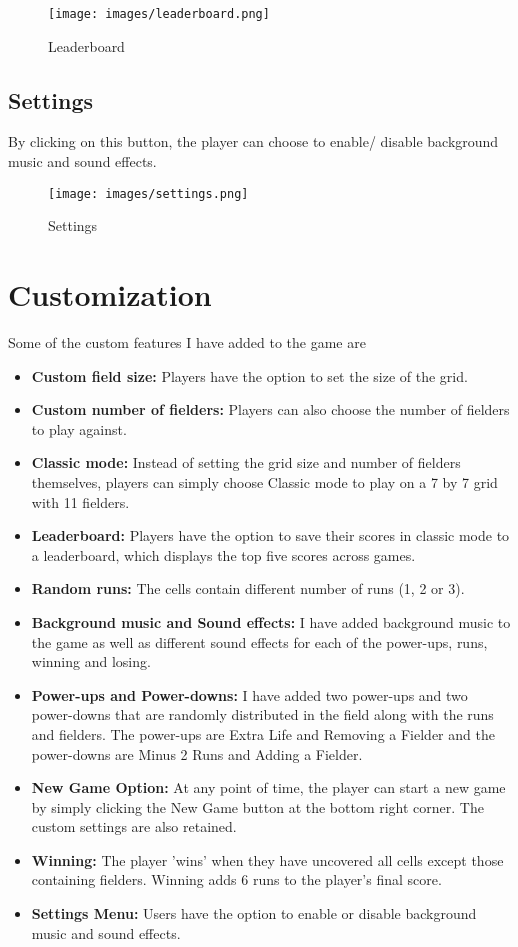 \documentclass{article}
\begin{document}
\begin{figure}[h!]
    \centering
    \texttt{[image: images/leaderboard.png]}
    \caption{Leaderboard}
    \label{fig:enter-label}
\end{figure}

\subsection{Settings}
By clicking on this button, the player can choose to enable/ disable background music and sound effects.

\begin{figure}[h!]
    \centering
    \texttt{[image: images/settings.png]}
    \caption{Settings}
    \label{fig:enter-label}
\end{figure}

\section{Customization}
Some of the custom features I have added to the game are
\begin{itemize}
    \item \textbf{Custom field size:} Players have the option to set the size of the grid.
    \item \textbf{Custom number of fielders:} Players can also choose the number of fielders to play against.
    \item \textbf{Classic mode:} Instead of setting the grid size and number of fielders themselves, players can simply choose Classic mode to play on a 7 by 7 grid with 11 fielders.
    \item \textbf{Leaderboard:} Players have the option to save their scores in classic mode to a leaderboard, which displays the top five scores across games.
    \item \textbf{Random runs:} The cells contain different number of runs (1, 2 or 3).
    \item \textbf{Background music and Sound effects:} I have added background music to the game as well as different sound effects for each of the power-ups, runs, winning and losing.
    \item \textbf{Power-ups and Power-downs:} I have added two power-ups and two power-downs that are randomly distributed in the field along with the runs and fielders. The power-ups are Extra Life and Removing a Fielder and the power-downs are Minus 2 Runs and Adding a Fielder.
    \item \textbf{New Game Option:} At any point of time, the player can start a new game by simply clicking the New Game button at the bottom right corner. The custom settings are also retained.
    \item \textbf{Winning:} The player 'wins' when they have uncovered all cells except those containing fielders. Winning adds 6 runs to the player's final score.
    \item \textbf{Settings Menu:} Users have the option to enable or disable background music and sound effects.
    
\end{itemize}
\end{document}
